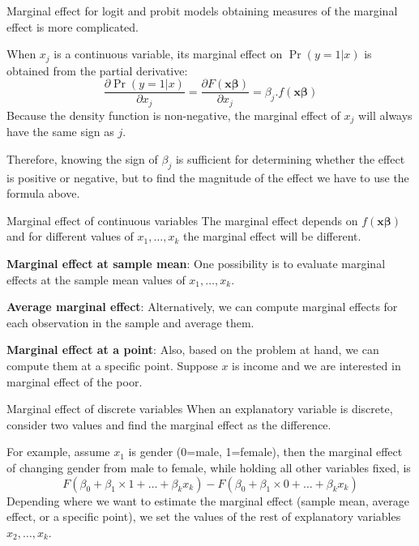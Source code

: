 \documentclass{beamer}
\begin{document}
\begin{frame}{Marginal effect}
for logit and probit models obtaining measures of the marginal effect is more complicated. \bigskip

When $x_j$ is a continuous variable, its marginal effect on $\Pr (y = 1|x)$ is obtained from the partial derivative:
\[\frac{\partial \Pr (y=1|x)}{\partial x_j}=\frac{\partial F(\mathbf{x\beta})}{\partial x_j}=\beta_j.f(\mathbf{x\beta}) \]
Because the density function is non-negative, the marginal effect of $x_j$ will always have the same sign as $j$.\bigskip

Therefore, knowing the sign of $\beta_j$ is sufficient for determining whether the effect is positive or negative, but to find the magnitude of the effect we have to use the formula above.
\end{frame}

\begin{frame}{Marginal effect of continuous variables}
The marginal effect depends on $f(\mathbf{x\beta})$ and for different values of $x_1,\dots, x_k$ the marginal effect will be different.\bigskip 

\textbf{Marginal effect at sample mean}: One possibility is to evaluate marginal effects at the sample mean values of $x_1,\dots, x_k$.\bigskip

\textbf{Average marginal effect}: Alternatively, we can compute marginal effects for each observation in the sample and average them.\bigskip

\textbf{Marginal effect at a point}: Also, based on the problem at hand, we can compute them at a specific point. Suppose $x$ is income and we are interested in marginal effect of the poor.

\end{frame}

\begin{frame}{Marginal effect of discrete variables}
When an explanatory variable is discrete, consider two values and find the marginal effect as the difference.\bigskip 

For example, assume $x_1$ is gender (0=male, 1=female), then the marginal effect of changing gender from male to female, while holding all other variables fixed, is
\[F(\beta_0+\beta_1\times 1+\dots+\beta_kx_k)-F(\beta_0+\beta_1\times 0+\dots+\beta_kx_k) \]
Depending where we want to estimate the marginal effect  (sample mean, average effect, or a specific point), we set the values of the rest of explanatory variables $x_2,\dots,x_k$.
\end{frame}
\end{document}
